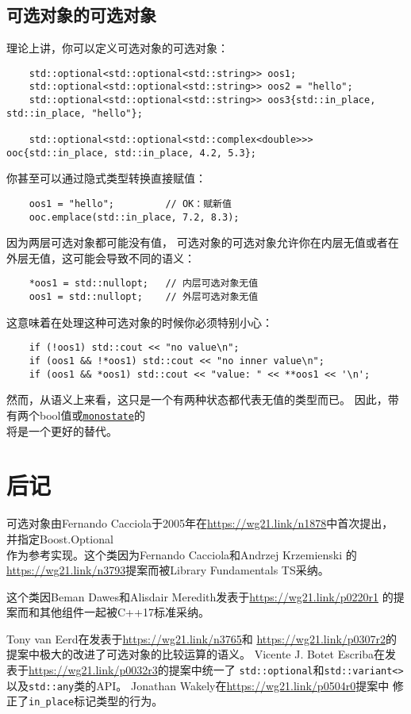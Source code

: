 \subsection{可选对象的可选对象}
理论上讲，你可以定义可选对象的可选对象：
\begin{lstlisting}
    std::optional<std::optional<std::string>> oos1;
    std::optional<std::optional<std::string>> oos2 = "hello";
    std::optional<std::optional<std::string>> oos3{std::in_place, std::in_place, "hello"};

    std::optional<std::optional<std::complex<double>>> ooc{std::in_place, std::in_place, 4.2, 5.3};
\end{lstlisting}
你甚至可以通过隐式类型转换直接赋值：
\begin{lstlisting}
    oos1 = "hello";         // OK：赋新值
    ooc.emplace(std::in_place, 7.2, 8.3);
\end{lstlisting}
因为两层可选对象都可能没有值，
可选对象的可选对象允许你在内层无值或者在外层无值，这可能会导致不同的语义：
\begin{lstlisting}
    *oos1 = std::nullopt;   // 内层可选对象无值
    oos1 = std::nullopt;    // 外层可选对象无值
\end{lstlisting}
这意味着在处理这种可选对象的时候你必须特别小心：
\begin{lstlisting}
    if (!oos1) std::cout << "no value\n";
    if (oos1 && !*oos1) std::cout << "no inner value\n";
    if (oos1 && *oos1) std::cout << "value: " << **oos1 << '\n';
\end{lstlisting}
然而，从语义上来看，这只是一个有两种状态都代表无值的类型而已。
因此，带有两个bool值或\hyperref[ch16.2.1]{\texttt{monostate}}的\\
将是一个更好的替代。

\section{后记}
可选对象由Fernando Cacciola于2005年在\url{https://wg21.link/n1878}中首次提出，
并指定Boost.Optional\\
作为参考实现。这个类因为Fernando Cacciola和Andrzej Krzemienski
的\url{https://wg21.link/n3793}提案而被Library Fundamentals TS采纳。

这个类因Beman Dawes和Alisdair Meredith发表于\url{https://wg21.link/p0220r1}
的提案而和其他组件一起被C++17标准采纳。

Tony van Eerd在发表于\url{https://wg21.link/n3765}和
\url{https://wg21.link/p0307r2}的提案中极大的改进了可选对象的比较运算的语义。
Vicente J. Botet Escriba在发表于\url{https://wg21.link/p0032r3}的提案中统一了
\texttt{std::optional}和\texttt{std::variant<>}以及\texttt{std::any}类的API。
Jonathan Wakely在\url{https://wg21.link/p0504r0}提案中
修正了\texttt{in\_place}标记类型的行为。